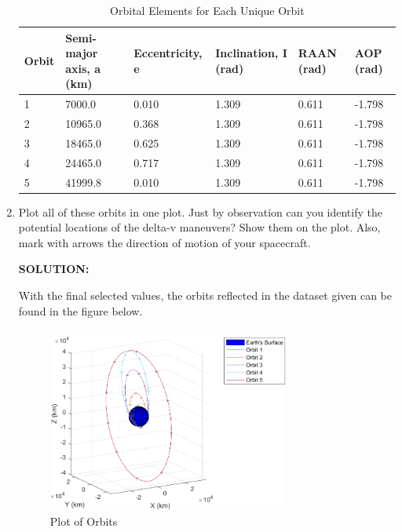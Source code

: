 \documentclass[12pt, letterpaper]{aiaa-tc}
\begin{document}
\begin{enumerate}
    \begin{table}[]
        \centering
        \begin{tabular}{|l|l|l|l|l|l|}
        \hline
        Orbit & Semi-major axis, a (km) & Eccentricity, e & Inclination, I (rad) & RAAN (rad) & AOP (rad) \\ \hline
        1     & 7000.0                  & 0.010           & 1.309                & 0.611      & -1.798    \\ \hline
        2     & 10965.0                 & 0.368           & 1.309                & 0.611      & -1.798    \\ \hline
        3     & 18465.0                 & 0.625           & 1.309                & 0.611      & -1.798    \\ \hline
        4     & 24465.0                 & 0.717           & 1.309                & 0.611      & -1.798    \\ \hline
        5     & 41999.8                 & 0.010           & 1.309                & 0.611      & -1.798    \\ \hline
        \end{tabular}
        \caption{Orbital Elements for Each Unique Orbit}
    \end{table}

    \item Plot all of these orbits in one plot. Just by observation can you identify the potential locations of the delta-v
    maneuvers? Show them on the plot. Also, mark with arrows the direction of motion of your spacecraft.

    \textbf{SOLUTION:}

    With the final selected values, the orbits reflected in the dataset given can be found in the figure below.

    \begin{figure}[h]
        \centering
        \includegraphics[width=0.75\textwidth]{num_orbits}
        \caption{Plot of Orbits}
        \label{fig:num_orbits}
    \end{figure}


\end{enumerate}
\end{document}
